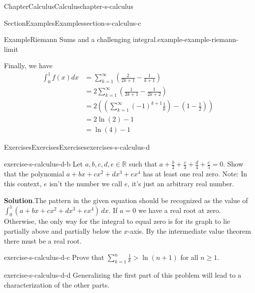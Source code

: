 \documentclass[oneside,10pt,]{book}
\newcommand{\blocktitlefont}{\relax}
\numberwithin{equation}{section}
\begin{document}
\begin{chapterptx}{Chapter}{Calculus}{}{Calculus}{}{}{chapter-s-calculus}
\begin{sectionptx}{Section}{Examples}{}{Examples}{}{}{section-s-calculus-c}
\begin{example}{Example}{Riemann Sums and a challenging integral.}{example-example-riemann-limit}
\par
Finally, we have%
\begin{equation*}
\begin{split}
\int_{0}^{1} f(x) dx & = \sum_{k=1}^{\infty} \left( \frac{2}{2k+1}-  \frac{1}{k+1} \right) \\
&  = 2 \sum_{k=1}^{\infty} \left( \frac{1}{2k+1} - \frac{1}{2k+2} \right) \\
&  = 2 \left(\left( \sum_{k=1}^{\infty} (-1)^{k+1}\frac{1}{k}\right)  - (1-\frac{1}{2}) \right)\\
& = 2 \ln(2) - 1\\
& = \ln(4) - 1
\end{split}
\end{equation*}
%
\end{example}
\end{sectionptx}
%
%
\typeout{************************************************}
\typeout{************************************************}
%
\begin{exercises-section}{Exercises}{Exercises}{}{Exercises}{}{}{exercises-s-calculus-d}
\begin{divisionexercise}{1}{}{}{exercise-s-calculus-d-b}%
Let \(a,b,c,d,e \in \mathbb{R}\) such that \(a + \frac{b}{2} + \frac{c}{3} + \frac{d}{4} + \frac{e}{5} = 0\). Show that the polynomial \(a+bx+c x^2 +d x^3 +e x^4\) has at least one real zero. Note: In this context, \(e\) isn't the number we call \(e\), it's just an arbitrary real number.%
\par\smallskip%
\noindent\textbf{\blocktitlefont Solution}.\hypertarget{solution-s-calculus-d-b-b}{}\quad{}The pattern in the given equation should be recognized as the value of \(\int_0^1 \left(a+b x+c x^2+d x^3+e x^4\right) \, dx\).  If \(a=0\) we have a real root at zero. Otherwise, the only way for the integral to equal zero is for its graph to lie partially above and partially below the \(x\)-axis.  By the intermediate value theorem there must be a real root.%
\end{divisionexercise}%
\begin{divisionexercise}{2}{}{}{exercise-s-calculus-d-c}%
Prove that \(\sum _{k=1}^n \frac{1}{k}>\ln  (n+1)\)  for all \(n\geq 1\).%
\end{divisionexercise}%
\begin{divisionexercise}{3}{}{}{exercise-s-calculus-d-d}%
Generalizing the first part of this problem will lead to a characterization of the other parts.%
\begin{enumerate}[label=(\alph*)]

\end{enumerate}
\end{divisionexercise}
\end{exercises-section}
\end{chapterptx}
\end{document}
